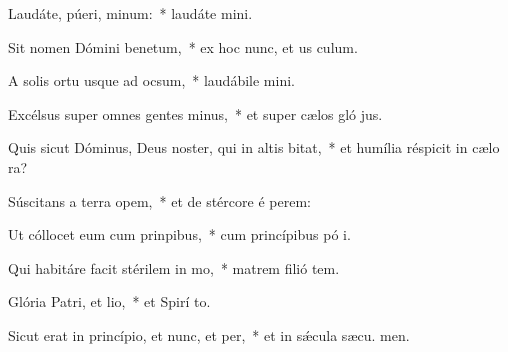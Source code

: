 \item Laudáte, púeri, minum:~* laudáte  mini.
\item Sit nomen Dómini benetum,~* ex hoc nunc, et us  culum.
\item A solis ortu usque ad ocsum,~* laudábile  mini.
\item Excélsus super omnes gentes minus,~* et super cælos gló jus.
\item Quis sicut Dóminus, Deus noster, qui in altis bitat,~* et humília réspicit in cælo   ra?
\item Súscitans a terra opem,~* et de stércore é perem:
\item Ut cóllocet eum cum prinpibus,~* cum princípibus pó i.
\item Qui habitáre facit stérilem in mo,~* matrem filió tem.
\item Glória Patri, et lio,~* et Spirí to.
\item Sicut erat in princípio, et nunc, et per,~* et in sǽcula sæcu. men.
